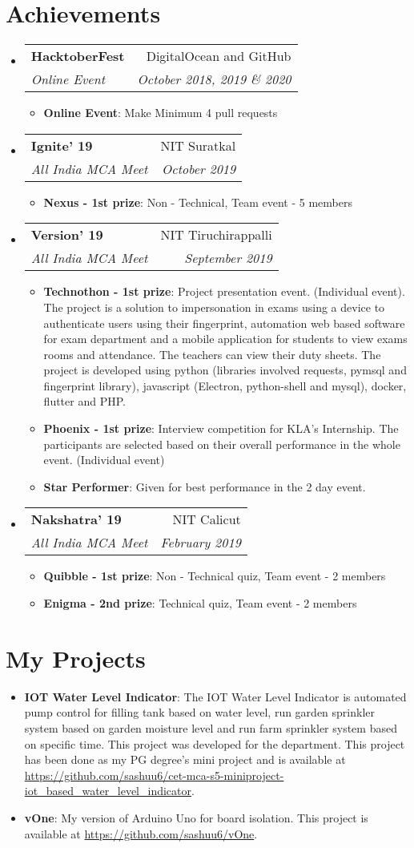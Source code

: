 \documentclass[letterpaper,11pt]{article}
\makeatletter
\newcommand{\resumeItem}[2]{
	\item\small{
    		\textbf{#1}{: #2 \vspace{-2pt}}
  	}
}
\newcommand{\resumeSubheading}[4]{
  	\vspace{-1pt}\item
    	\begin{tabular*}{0.97\textwidth}[t]{l@{\extracolsep{\fill}}r}
      		\textbf{#1} & #2 \\
      		\textit{\small#3} & \textit{\small #4} \\
    	\end{tabular*}\vspace{-5pt}
}
\newcommand{\resumeSubItem}[2]{\resumeItem{#1}{#2}\vspace{-4pt}}
\newcommand{\resumeSubHeadingListStart}{\begin{itemize}[leftmargin=*]}
\newcommand{\resumeSubHeadingListEnd}{\end{itemize}}
\newcommand{\resumeItemListStart}{\begin{itemize}}
\newcommand{\resumeItemListEnd}{\end{itemize}\vspace{-5pt}}
\makeatother
\begin{document}
\section{Achievements}
  	\resumeSubHeadingListStart
		\resumeSubheading
      			{HacktoberFest}{DigitalOcean and GitHub}
      			{Online Event}{October 2018, 2019 \& 2020}
			\resumeItemListStart
      				\resumeItem{Online Event}
          				{Make Minimum 4 pull requests}
       			\resumeItemListEnd
		\resumeSubheading
      			{Ignite' 19}{NIT Suratkal}
      			{All India MCA Meet}{October 2019}
			\resumeItemListStart
      				\resumeItem{Nexus - 1st prize}
          				{Non - Technical, Team event - 5 members}
       			\resumeItemListEnd
		\resumeSubheading
      			{Version' 19}{NIT Tiruchirappalli}
      			{All India MCA Meet}{September 2019}
			\resumeItemListStart
      				\resumeItem{Technothon - 1st prize}
          				{Project presentation event. (Individual event). The project is a solution to impersonation in exams using a device to authenticate users using their fingerprint, automation web based software for exam department and a mobile application for students to view exams rooms and attendance. The teachers can view their duty sheets. The project is developed using python (libraries involved requests, pymsql and fingerprint library), javascript (Electron, python-shell and mysql), docker, flutter and PHP.}
				\resumeItem{Phoenix - 1st prize}
          				{Interview competition for KLA's Internship. The participants are selected based on their overall performance in the whole event. (Individual event)}
				\resumeItem{Star Performer}
          				{Given for best performance in the 2 day event.}
       			\resumeItemListEnd
   		\resumeSubheading
      			{Nakshatra' 19}{NIT Calicut}
      			{All India MCA Meet}{February 2019}
			\resumeItemListStart
      				\resumeItem{Quibble - 1st prize}
          				{Non - Technical quiz, Team event - 2 members}
				\resumeItem{Enigma - 2nd prize}
          				{Technical quiz, Team event - 2 members}
       			\resumeItemListEnd
  	\resumeSubHeadingListEnd

\section{My Projects}
  	\resumeSubHeadingListStart
		\resumeSubItem{IOT Water Level Indicator}
      			{ The IOT Water Level Indicator is automated pump control for filling tank based on water level, run garden sprinkler system based on garden moisture level and run farm sprinkler system based on specific time. This project was developed for the department. This project has been done as my PG degree's mini project and  is available at \url{https://github.com/sashuu6/cet-mca-s5-miniproject-iot_based_water_level_indicator}.}
        		\resumeSubItem{vOne}
      			{My version of Arduino Uno for board isolation. This project is available at \url{https://github.com/sashuu6/vOne}.}  	\resumeSubHeadingListEnd
\end{document}
